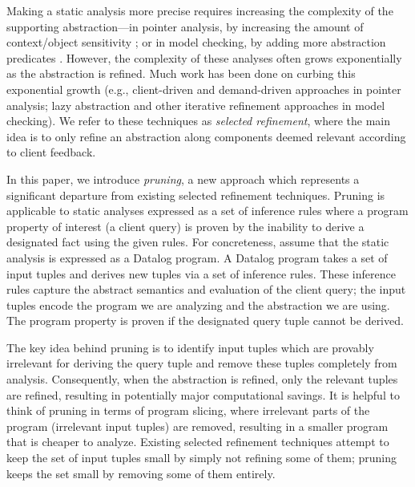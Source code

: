 
Making a static analysis more precise requires increasing the complexity of the
supporting abstraction---in pointer analysis, by increasing the amount of
context/object sensitivity \cite{kcfa, kobj, MilanovaRountevRyder2005,
WhaleyLam2004, LhotakHendren2006, LhotakHendren2008}; or in model checking, by
adding more abstraction predicates \cite{graf97predicate,slam}.
However, the complexity of these analyses often grows exponentially as the
abstraction is refined.
Much work has been done on curbing this exponential growth
(e.g., client-driven \cite{GuyerLin2003} and demand-driven
\cite{HeintzeTardieu2001} approaches in pointer analysis;
lazy abstraction \cite{henzinger02lazy,mcmillan06lazy} and other iterative refinement approaches in model checking).
We refer to these techniques as {\em selected refinement},
where the main idea is to only refine an abstraction along components
deemed relevant according to client feedback.

In this paper, we introduce {\em pruning}, a new approach which represents a
significant departure from existing selected refinement techniques.  Pruning is
applicable to static analyses expressed as a set of inference rules where a
program property of interest (a client query) is proven by the inability to
derive a designated fact using the given rules.  For concreteness, assume that
the static analysis is expressed as a Datalog program.  A Datalog program takes
a set of input tuples and derives new tuples via a set of inference rules.
These inference rules capture the abstract semantics and evaluation of the
client query; the input tuples encode the program we are analyzing and the
abstraction we are using.  The program property is proven if the
designated query tuple cannot be derived.

The key idea behind pruning is to identify input tuples which are provably
irrelevant for deriving the query tuple and remove these tuples completely from
analysis.  Consequently, when the abstraction is refined, only the relevant
tuples are refined, resulting in potentially major computational savings.  It
is helpful to think of pruning in terms of program slicing, where
irrelevant parts of the program (irrelevant input tuples) are removed,
resulting in a smaller program that is cheaper to analyze.  Existing selected
refinement techniques attempt to keep the set of input tuples small by simply
not refining some of them; pruning keeps the set small by removing some of them
entirely.

